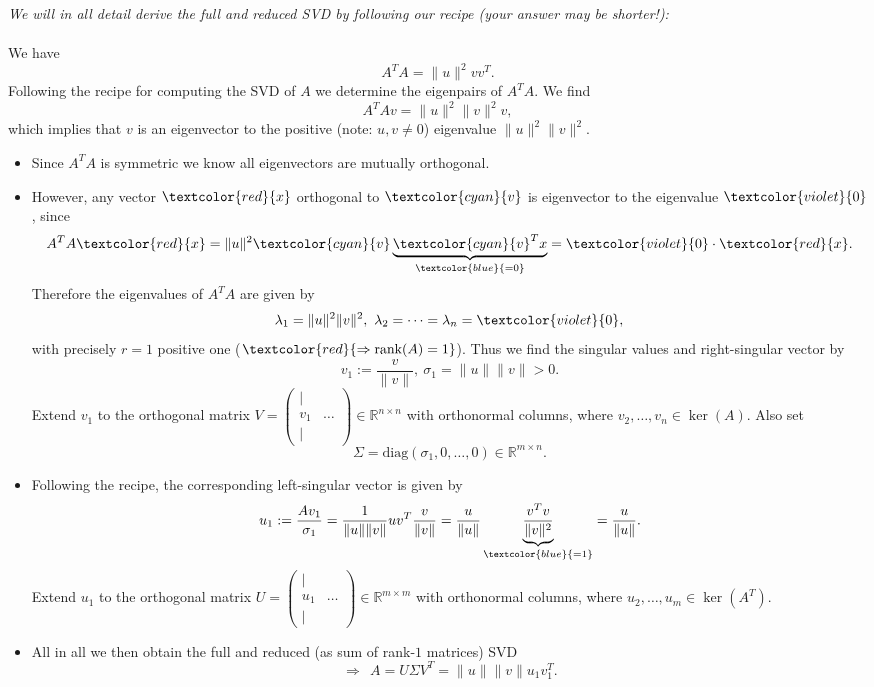 {\color{solution}
\textit{We will in all detail derive the full and reduced SVD by following our recipe (your answer may be shorter!):	}~\\~\\
We have $$A^TA=\|u\|^2vv^T.$$
Following the recipe for computing the SVD of $A$ we determine the eigenpairs of $A^TA$. We find
$$A^TAv=\|u\|^2\|v\|^2v,$$
which implies that $v$ is an eigenvector to the positive (note: $u,v \neq 0$) eigenvalue $\|u\|^2\|v\|^2$.
\begin{itemize}
	\item 
	Since $A^TA$ is symmetric we know all eigenvectors are mutually orthogonal.
	\item 
	However, any vector $\textcolor{red}{x}$ orthogonal to $\textcolor{cyan}{v}$ is eigenvector to the eigenvalue $\textcolor{violet}{0}$, since $$A^TA\textcolor{red}{x}=\|u\|^2\textcolor{cyan}{v}\underbrace{\textcolor{cyan}{v}^Tx}_{\textcolor{blue}{=0}}=\textcolor{violet}{0}\cdot\textcolor{red}{x}.$$
	Therefore the eigenvalues of $A^TA$ are given by
	$$\lambda_1=\|u\|^2\|v\|^2,~\lambda_2=\dots=\lambda_n=\textcolor{violet}{0},$$
	with precisely $r=1$ positive one ($\textcolor{red}{\Rightarrow\text{rank}(A)=1}$).
	Thus we find the singular values and right-singular vector by
	$$v_1:=\frac{v}{\|v\|},~\sigma_1=\|u\|\|v\|>0.$$
		Extend $v_1$ to the orthogonal matrix $V=\begin{pmatrix}|& \\v_1&\dots\\|& \end{pmatrix}\in\mathbb{R}^{n\times n}$ with orthonormal columns, where $v_2,\ldots,v_n \in \ker(A)$.
		Also set $$\Sigma = \text{diag}(\sigma_1,0,\ldots, 0) \in \mathbb{R}^{m \times n}.$$
	\item 
	Following the recipe, the corresponding left-singular vector is given by  
	$$u_1 :=\frac{Av_1}{\sigma_1}=\frac{1}{\|u\|\|v\|}uv^T\frac{v}{\|v\|}=\frac{u}{\|u\|}\underbrace{\frac{v^Tv}{\|v\|^2}}_{\textcolor{blue}{=1}}=\frac{u}{\|u\|}.$$
	Extend $u_1$ to the orthogonal matrix $U=\begin{pmatrix}|& \\u_1&\dots\\|& \end{pmatrix}\in\mathbb{R}^{m\times m}$ with orthonormal columns, where $u_2,\ldots,u_m \in \ker(A^T)$.
	\item All in all we then obtain the full and reduced (as sum of rank-$1$ matrices) SVD
	$$
	\Rightarrow~~A= U\Sigma V^T = \|u\|\|v\|u_1v_1^T.
	$$
\end{itemize}

}